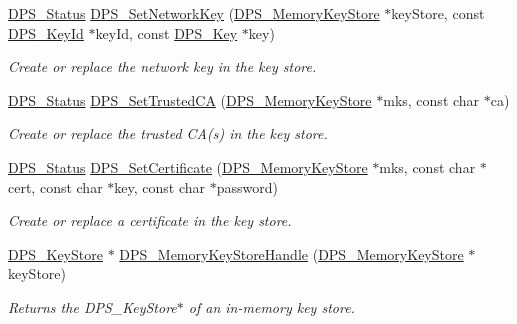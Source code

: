 \begin{DoxyCompactItemize}
\hyperlink{group__status_ga30395a84d3cad9d4ec29848106415038}{D\+P\+S\+\_\+\+Status} \hyperlink{group__keystore_ga8664b8c5cc2d3df6512ecb71e7f92212}{D\+P\+S\+\_\+\+Set\+Network\+Key} (\hyperlink{group__keystore_ga57f11410b3ef6a686594b60836dc8c99}{D\+P\+S\+\_\+\+Memory\+Key\+Store} $\ast$key\+Store, const \hyperlink{group__keystore_ga4345e29dd2ad5d7fd88a1e988787bd72}{D\+P\+S\+\_\+\+Key\+Id} $\ast$key\+Id, const \hyperlink{group__keystore_gaa56a1429b6a1658e674eea558bdbbfc0}{D\+P\+S\+\_\+\+Key} $\ast$key)
\begin{DoxyCompactList}\small\item\em Create or replace the network key in the key store. \end{DoxyCompactList}\item 
\hyperlink{group__status_ga30395a84d3cad9d4ec29848106415038}{D\+P\+S\+\_\+\+Status} \hyperlink{group__keystore_ga8d55f887ebbd6b0af80caa43bf77a088}{D\+P\+S\+\_\+\+Set\+Trusted\+CA} (\hyperlink{group__keystore_ga57f11410b3ef6a686594b60836dc8c99}{D\+P\+S\+\_\+\+Memory\+Key\+Store} $\ast$mks, const char $\ast$ca)
\begin{DoxyCompactList}\small\item\em Create or replace the trusted C\+A(s) in the key store. \end{DoxyCompactList}\item 
\hyperlink{group__status_ga30395a84d3cad9d4ec29848106415038}{D\+P\+S\+\_\+\+Status} \hyperlink{group__keystore_ga7a8c6874dd5bff0a6391a5515b545e17}{D\+P\+S\+\_\+\+Set\+Certificate} (\hyperlink{group__keystore_ga57f11410b3ef6a686594b60836dc8c99}{D\+P\+S\+\_\+\+Memory\+Key\+Store} $\ast$mks, const char $\ast$cert, const char $\ast$key, const char $\ast$password)
\begin{DoxyCompactList}\small\item\em Create or replace a certificate in the key store. \end{DoxyCompactList}\item 
\hyperlink{group__keystore_gaf3833cfe48f848f698514bc5daa075fa}{D\+P\+S\+\_\+\+Key\+Store} $\ast$ \hyperlink{group__keystore_ga2811c4ffff51bd75a72dd0a9c8796616}{D\+P\+S\+\_\+\+Memory\+Key\+Store\+Handle} (\hyperlink{group__keystore_ga57f11410b3ef6a686594b60836dc8c99}{D\+P\+S\+\_\+\+Memory\+Key\+Store} $\ast$key\+Store)
\begin{DoxyCompactList}\small\item\em Returns the {\ttfamily D\+P\+S\+\_\+\+Key\+Store$\ast$} of an in-\/memory key store. \end{DoxyCompactList}\end{DoxyCompactItemize}


